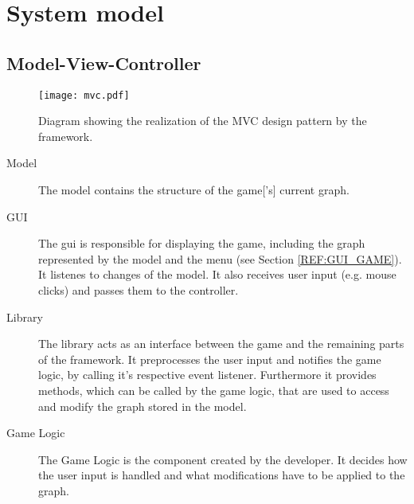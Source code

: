 \section{System model}

\subsection{Model-View-Controller}


\begin{figure}[h]
	\centering
	\texttt{[image: mvc.pdf]}
	\caption{Diagram showing the realization of the \gls{MVC} design pattern by the framework.}
	\label{img:MVC}
\end{figure}

\begin{description}
\item[Model] The model contains the structure of the \gls{game}['s] current \gls{graph}.
\item[GUI] The \gls{gui} is responsible for displaying the game, including the \gls{graph} represented by the model and the menu (see Section \ref{REF:GUI_GAME}). It listenes to changes of the model. It also receives user input (e.g. mouse clicks) and passes them to the controller.
\item[Library] The library acts as an interface between the game and the remaining parts of the framework. It preprocesses the user input and notifies the game logic, by calling it's respective event listener. Furthermore it provides methods, which can be called by the game logic, that are used to access and modify the \gls{graph} stored in the model.
\item[Game Logic] The Game Logic is the component created by the \gls{developer}. It decides how the user input is handled and what modifications have to be applied to the \gls{graph}. 
\end{description}